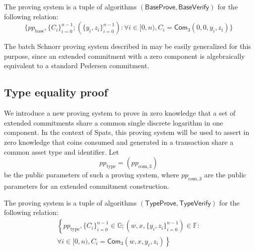 \documentclass{article}
\newcommand{\G}{\mathbb{G}}
\newcommand{\F}{\mathbb{F}}
\newcommand{\func}[1]{\mathsf{#1}}
\newcommand{\com}{\func{Com}}
\begin{document}
The proving system is a tuple of algorithms $(\func{BaseProve}, \func{BaseVerify})$ for the following relation:
$$\{ pp_{\text{base}}, \{C_i\}_{i=0}^{n-1} ; (\{y_i, z_i\}_{i=0}^{n-1}) : \forall i \in [0,n), C_i = \com_3(0, 0, y_i, z_i) \}$$

The batch Schnorr proving system described in \cite{batch_schnorr} may be easily generalized for this purpose, since an extended commitment with a zero component is algebraically equivalent to a standard Pedersen commitment.


\subsection{Type equality proof}

We introduce a new proving system to prove in zero knowledge that a set of extended commitments share a common single discrete logarithm in one component.
In the context of Spats, this proving system will be used to assert in zero knowledge that coins consumed and generated in a transaction share a common asset type and identifier.
Let $$pp_{\text{type}} = (pp_{\text{com},3})$$ be the public parameters of such a proving system, where $pp_{\text{com},3}$ are the public parameters for an extended commitment construction.

The proving system is a tuple of algorithms $(\func{TypeProve}, \func{TypeVerify})$ for the following relation:
\begin{multline*}
\left\{ pp_{\text{type}}, \{C_i\}_{i=0}^{n-1} \in \G ; (w, x, \{y_i, z_i\}_{i=0}^{n-1}) \in \F : \right. \\
\left. \forall i \in [0,n), C_i = \com_3(w, x, y_i, z_i) \right\}
\end{multline*}
\end{document}
